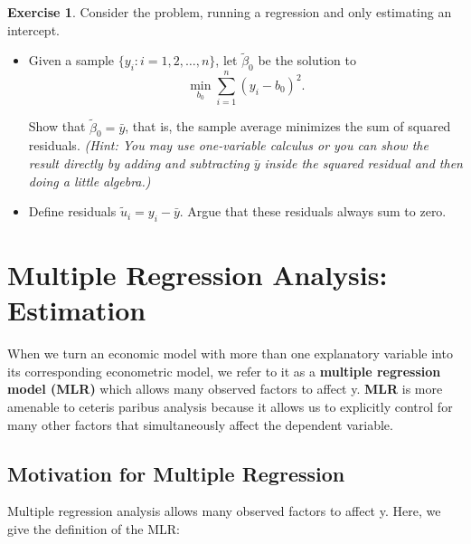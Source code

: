 \documentclass[a4paper, 10pt]{article}
\theoremstyle{definition}	%
\newtheorem{exercise}{Exercise}
\begin{document}
\begin{exercise}
    Consider the problem, running a regression and only estimating an intercept.
\begin{itemize}
    \item[(i)] Given a sample $\{ y_i : i = 1, 2, \ldots, n \}$, let $\tilde{\beta}_0$ be the solution to
    \[
    \min_{b_0} \sum_{i=1}^{n} (y_i - b_0)^2.
    \]
    
    Show that $\tilde{\beta}_0 = \bar{y}$, that is, the sample average minimizes the sum of squared residuals. 
    \textit{(Hint: You may use one-variable calculus or you can show the result directly by adding and subtracting $\bar{y}$ inside the squared residual and then doing a little algebra.)}
    
    \item[(ii)] Define residuals $\tilde{u}_i = y_i - \bar{y}$. Argue that these residuals always sum to zero.
\end{itemize}
\end{exercise}

\newpage

\section{Multiple Regression Analysis: Estimation}
\setcounter{equation}{0}
\setcounter{theorem}{0}
\setcounter{assumption}{0}

When we turn an economic model with more than one explanatory variable into its corresponding econometric model, we refer to it as a \textbf{multiple regression model (MLR)} which allows many observed factors to affect y. \textbf{MLR} is more amenable to ceteris paribus analysis because it allows us to explicitly control for many other factors that simultaneously affect the dependent variable.

\subsection{Motivation for Multiple Regression}
Multiple regression analysis allows many observed factors to affect y. Here, we give the definition of the MLR:
\end{document}
